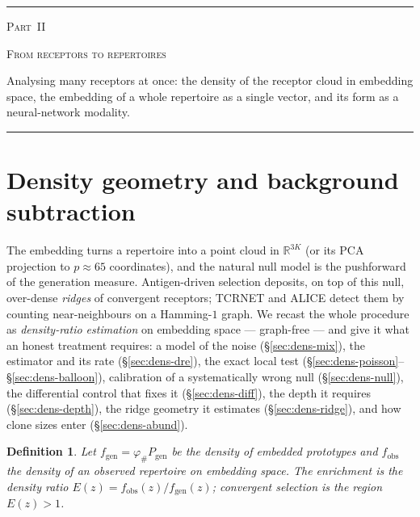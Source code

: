 \documentclass[11pt]{article}
\theoremstyle{oldplain}
\theoremstyle{oldrem}
\newtheorem{definition}{Definition}
\newcommand{\Pgen}{P_{\mathrm{gen}}}
\newcommand{\R}{\mathds{R}}  %
\newcommand{\apppart}[3]{%
  \par\addvspace{2.4em}%
  {\centering
    {\color{cGray}\rule{0.45\linewidth}{0.4pt}}\par\vspace{0.7em}%
    {\scshape\large Part~#1}\par\vspace{0.25em}%
    {\scshape\LARGE #2}\par\vspace{0.5em}%
    {\itshape\small\parbox{0.78\linewidth}{\centering #3}\par}\vspace{0.65em}%
    {\color{cGray}\rule{0.45\linewidth}{0.4pt}}\par
  }%
  \addvspace{1.8em}\par\nobreak
}
\begin{document}
\apppart{II}{From receptors to repertoires}{Analysing many receptors at once: the density of the receptor
cloud in embedding space, the embedding of a whole repertoire as a single vector, and its form as a
neural-network modality.}

\section{Density geometry and background subtraction}\label{sec:density}

The embedding turns a repertoire into a point cloud in $\R^{3K}$ (or its {\scshape PCA} projection to
$p\approx65$ coordinates), and the natural null model is the pushforward of the generation measure.
Antigen-driven selection deposits, on top of this null, over-dense \emph{ridges} of convergent receptors;
{\scshape TCRNET} and {\scshape ALICE} \cite{Ritvo2018,Pogorelyy2019,PogorelyyShugay2019} detect
them by counting near-neighbours on a Hamming-$1$ graph. We recast the whole procedure as \emph{density-ratio
estimation} on embedding space --- graph-free --- and give it what an honest treatment requires: a
model of the noise (\S\ref{sec:dens-mix}), the estimator and its rate (\S\ref{sec:dens-dre}), the exact local
test (\S\ref{sec:dens-poisson}--\S\ref{sec:dens-balloon}), calibration of a systematically wrong null
(\S\ref{sec:dens-null}), the differential control that fixes it (\S\ref{sec:dens-diff}), the depth it
requires (\S\ref{sec:dens-depth}), the ridge geometry it estimates (\S\ref{sec:dens-ridge}), and how clone
sizes enter (\S\ref{sec:dens-abund}).

\begin{definition}
Let $f_{\mathrm{gen}} = \varphi_{\#}\Pgen$ be the density of embedded prototypes and $f_{\mathrm{obs}}$
the density of an observed repertoire on embedding space. The \emph{enrichment} is the density ratio
$E(z)=f_{\mathrm{obs}}(z)/f_{\mathrm{gen}}(z)$; convergent selection is the region $E(z)>1$.
\end{definition}
\end{document}
